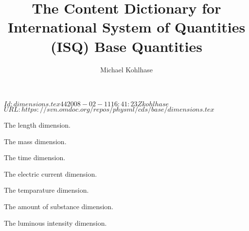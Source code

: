 \documentclass[twoside]{article}
\title{The Content Dictionary for International System of Quantities
  (ISQ) Base Quantities}
\author{Michael Kohlhase}
\begin{document}
\svnInfo $Id: dimensions.tex 44 2008-02-11 16:41:23Z kohlhase $
\svnKeyword $URL: https://svn.omdoc.org/repos/physml/cds/base/dimensions.tex $
\maketitle

\begin{module}[id=basedimensions]

\begin{consymb}[name=length]
  The length dimension.
\end{consymb}

\begin{consymb}[name=mass]
  The mass dimension.
\end{consymb}

\begin{consymb}[name=time]
  The time dimension.
\end{consymb}

\begin{consymb}[name=electriccurrent]
  The electric current dimension.
\end{consymb} 

\begin{consymb}[name=temperature]
  The temparature dimension.
\end{consymb} 

\begin{consymb}[name=amountofsubstance]
  The amount of substance dimension.
\end{consymb} 

\begin{consymb}[name=luminousintensity]
  The luminous intensity dimension.
\end{consymb}

\end{module}
\end{document}
